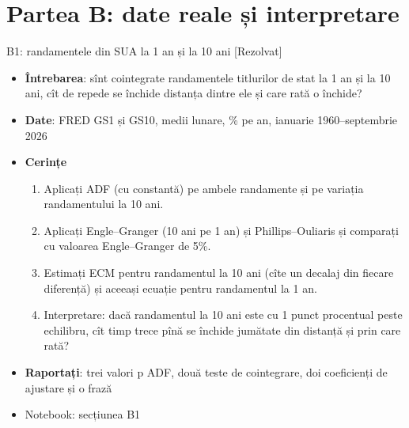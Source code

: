 \section{Partea B: date reale și interpretare}

\begin{frame}{B1: randamentele din SUA la 1 an și la 10 ani [Rezolvat]}
\itemsize{\footnotesize}
\begin{itemize}
\item \textbf{Întrebarea}: sînt cointegrate randamentele titlurilor de stat la 1 an și la 10 ani, cît de repede se închide distanța dintre ele și care rată o închide?
\item \textbf{Date}: FRED GS1 și GS10, medii lunare, \% pe an, ianuarie 1960--septembrie 2026
\item \textbf{Cerințe}
\begin{enumerate}
    \item Aplicați ADF (cu constantă) pe ambele randamente și pe variația randamentului la 10 ani.
    \item Aplicați Engle--Granger (10 ani pe 1 an) și Phillips--Ouliaris și comparați cu valoarea Engle--Granger de 5\%.
    \item Estimați ECM pentru randamentul la 10 ani (cîte un decalaj din fiecare diferență) și aceeași ecuație pentru randamentul la 1 an.
    \item Interpretare: dacă randamentul la 10 ani este cu 1 punct procentual peste echilibru, cît timp trece pînă se închide jumătate din distanță și prin care rată?
\end{enumerate}
\item \textbf{Raportați}: trei valori p ADF, două teste de cointegrare, doi coeficienți de ajustare și o frază
\item Notebook: secțiunea B1
\end{itemize}
\end{frame}

